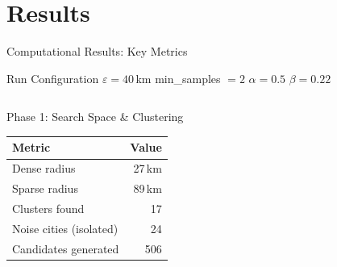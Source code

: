 \section{Results}

\begin{frame}[t]{Computational Results: Key Metrics}{}

    \begin{block}{\centering Run Configuration}
        \centering
        \vspace{0.1cm}
        {\small $\varepsilon = 40$\,km \hspace{0.5cm} min\_samples $=2$ \hspace{0.5cm} $\alpha = 0.5$ \hspace{0.5cm} $\beta = 0.22$}
        \vspace{0.1cm}
    \end{block}

    \vspace{0.3cm}
    \begin{columns}[T]
        \begin{block}{Phase 1: Search Space \& Clustering}
            \centering
            \renewcommand{\arraystretch}{1.3}
            \begin{tabular}{@{}l r@{}}
                \toprule
                \textbf{Metric}             & \textbf{Value} \\
                \midrule
                Dense radius                & 27\,km \\
                Sparse radius               & 89\,km \\
                Clusters found              & 17 \\
                Noise cities (isolated)     & 24 \\
                Candidates generated        & 506 \\
                \bottomrule
            \end{tabular}
        \end{block}


\end{columns}
\end{frame}
